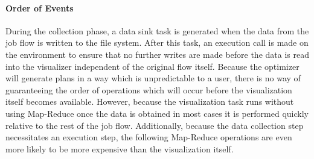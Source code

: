 \paragraph{Order of Events}
During the collection phase, a data sink task is generated when the data from the job flow is written to the file system. After this task, an execution call is made on the environment to ensure that no further writes are made before the data is read into the visualizer independent of the original flow itself. Because the optimizer will generate plans in a way which is unpredictable to a user, there is no way of guaranteeing the order of operations which will occur before the visualization itself becomes available. However, because the visualization task runs without using Map-Reduce once the data is obtained in most cases it is performed quickly relative to the rest of the job flow. Additionally, because the data collection step necessitates an execution step, the following Map-Reduce operations are even more likely to be more expensive than the visualization itself.
